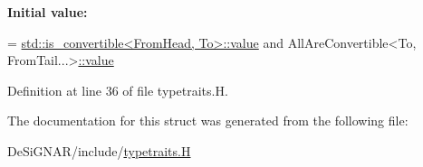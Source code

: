 {\bfseries Initial value\+:}
\begin{DoxyCode}
=
      \hyperlink{namespace_designar_a7dd2a7b6d96f664ce612b506c8eb2fb8}{std::is\_convertible<FromHead, To>::value} and
      AllAreConvertible<To, FromTail...>\hyperlink{struct_designar_1_1_all_are_convertible_a698b71c73875452298bc2e96935240c3}{::value}
\end{DoxyCode}


Definition at line 36 of file typetraits.\+H.



The documentation for this struct was generated from the following file\+:\begin{DoxyCompactItemize}
\item 
De\+Si\+G\+N\+A\+R/include/\hyperlink{typetraits_8_h}{typetraits.\+H}\end{DoxyCompactItemize}
